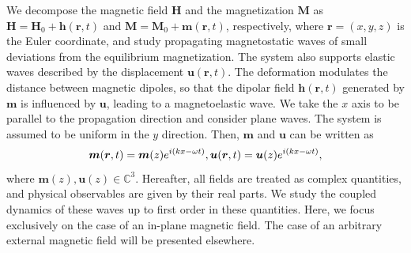 \documentclass[10pt]{iopart}
\begin{document}
We decompose the magnetic field $\bm{H}$ and the magnetization $\bm{M}$ as $\bm{H}=\bm{H}_0+\bm{h}(\bm{r},t)$ and $\bm{M}=\bm{M}_0+\bm{m}(\bm{r},t)$, respectively, where $\bm{r}=(x,y,z)$ is the Euler coordinate, and study propagating magnetostatic waves of small deviations from the equilibrium magnetization. The system also supports elastic waves described by the displacement $\bm{u}(\bm{r},t)$. The deformation modulates the distance between magnetic dipoles, so that the dipolar field $\bm{h}(\bm{r},t)$ generated by $\bm{m}$ is influenced by $\bm{u}$, leading to a magnetoelastic wave. We take the $x$ axis to be parallel to the propagation direction and consider plane waves. The system is assumed to be uniform in the $y$ direction. Then, $\bm{m}$ and $\bm{u}$ can be written as
\begin{equation}
    \bm{m}(\bm{r},t)=\bm{m}(z)e^{i(kx-\omega t)},\\
    \bm{u}(\bm{r},t)=\bm{u}(z)e^{i(kx-\omega t)},\label{eq:Assumption}
\end{equation}
where $\bm{m}(z),\bm{u}(z)\in\mathbb{C}^3$. Hereafter, all fields are treated as complex quantities, and physical observables are given by their real parts. We study the coupled dynamics of these waves up to first order in these quantities. Here, we focus exclusively on the case of an in-plane magnetic field. The case of an arbitrary external magnetic field will be presented elsewhere.
\end{document}
